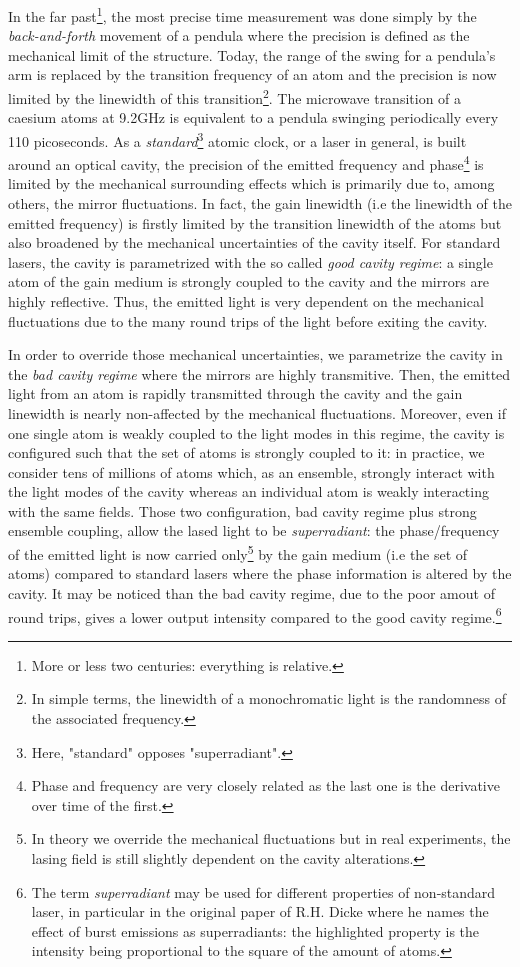 \documentclass[10pt]{report}
\begin{document}
In the far past\footnote{More or less two centuries: everything is relative.}, the most precise time measurement was done simply by the \textit{back-and-forth} movement of a pendula where the precision is defined as the mechanical limit of the structure. Today, the range of the swing for a pendula's arm is replaced by the transition frequency of an atom and the precision is now limited by the linewidth of this transition\footnote{In simple terms, the linewidth of a monochromatic light is the randomness of the associated frequency.}. The microwave transition of a caesium atoms at 9.2GHz is equivalent to a pendula swinging periodically every 110 picoseconds. As a \textit{standard}\footnote{Here, "standard" opposes "superradiant".} atomic clock, or a laser in general, is built around an optical cavity, the precision of the emitted frequency and phase\footnote{Phase and frequency are very closely related as the last one is the derivative over time of the first.} is limited by the mechanical surrounding effects which is primarily due to, among others, the mirror fluctuations. In fact, the gain linewidth (i.e the linewidth of the emitted frequency) is firstly limited by the transition linewidth of the atoms but also broadened by the mechanical uncertainties of the cavity itself. For standard lasers, the cavity is parametrized with the so called \textit{good cavity regime}: a single atom of the gain medium is strongly coupled to the cavity and the mirrors are highly reflective. Thus, the emitted light is very dependent on the mechanical fluctuations due to the many round trips of the light before exiting the cavity. 

In order to override those mechanical uncertainties, we parametrize the cavity in the \textit{bad cavity regime} where the mirrors are highly transmitive. Then, the emitted light from an atom is rapidly transmitted through the cavity and the gain linewidth is nearly non-affected by the mechanical fluctuations. Moreover, even if one single atom is weakly coupled to the light modes in this regime, the cavity is configured such that the set of atoms is strongly coupled to it: in practice, we consider tens of millions of atoms which, as an ensemble, strongly interact with the light modes of the cavity whereas an individual atom is weakly interacting with the same fields. Those two configuration, bad cavity regime plus strong ensemble coupling, allow the lased light to be \textit{superradiant}: the phase/frequency of the emitted light is now carried only\footnote{In theory we override the mechanical fluctuations but in real experiments, the lasing field is still slightly dependent on the cavity alterations.} by the gain medium (i.e the set of atoms) compared to standard lasers where the phase information is altered by the cavity. It may be noticed than the bad cavity regime, due to the poor amout of round trips, gives a lower output intensity compared to the good cavity regime.\footnote{The term \textit{superradiant} may be used for different properties of non-standard laser, in particular in the original paper of R.H. Dicke where he names the effect of burst emissions as superradiants: the highlighted property is the intensity being proportional to the square of the amount of atoms.}
\end{document}
